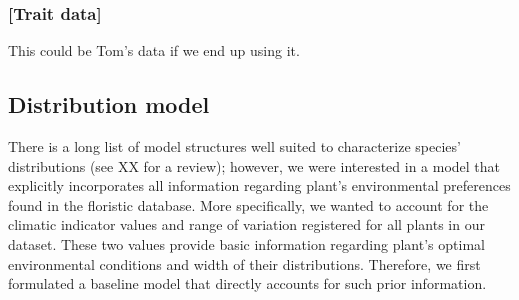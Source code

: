 \documentclass[11pt, a4paper]{article}
\begin{document}


{\color{gray}
\subsubsection*{[Trait data]}
This could be Tom's data if we end up using it.}

\subsection*{Distribution model}
There is a long list of model structures well suited to characterize species' distributions (see XX for a review); however, we were interested in a model that explicitly incorporates all information regarding plant's environmental preferences found in the floristic database. More specifically, we wanted to account for the climatic indicator values and range of variation registered for all plants in our dataset. These two values provide basic information regarding plant's optimal environmental conditions and width of their distributions. Therefore, we first formulated a baseline model that directly accounts for such prior information. 
\end{document}
